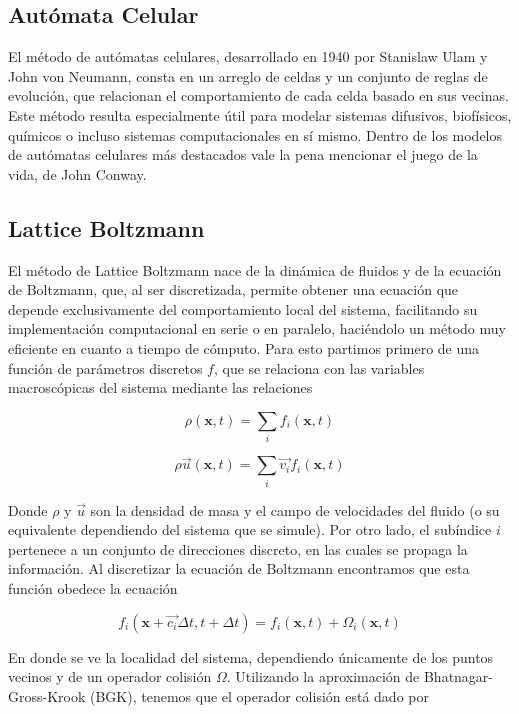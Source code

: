 \documentclass[12pts, letterpaper, twocolumn]{article}
\begin{document}
\subsection{Autómata Celular}
El método de autómatas celulares, desarrollado en 1940 por Stanislaw Ulam y John von 
Neumann, consta en un arreglo de celdas y un conjunto de reglas de evolución, que 
relacionan el comportamiento de cada celda basado en sus vecinas. Este método resulta 
especialmente útil para modelar sistemas difusivos, biofísicos, químicos o incluso 
sistemas computacionales en sí mismo. Dentro de los modelos de autómatas celulares más 
destacados vale la pena mencionar el juego de la vida, de John Conway.

\subsection{Lattice Boltzmann}
El método de Lattice Boltzmann nace de la dinámica de fluidos y de la ecuación de 
Boltzmann, que, al ser discretizada, permite obtener una ecuación que depende 
exclusivamente del comportamiento local del sistema, facilitando su implementación 
computacional en serie o en paralelo, haciéndolo un método muy eficiente en cuanto a 
tiempo de cómputo. Para esto partimos primero de una función de parámetros discretos $f$, 
que se relaciona con las variables macroscópicas del sistema mediante las relaciones 

\begin{equation*}
    \rho(\textbf{x}, t) = \sum_i f_i(\textbf{x}, t)
\end{equation*}

\begin{equation*}
    \rho\vec{u}(\textbf{x}, t) = \sum_i \vec{v_i} f_i(\textbf{x}, t)
\end{equation*}

Donde $\rho$ y $\vec{u}$ son la densidad de masa y el campo de velocidades del fluido (o 
su equivalente dependiendo del sistema que se simule). Por otro lado, el subíndice $i$ 
pertenece a un conjunto de direcciones discreto, en las cuales se propaga la información.
Al discretizar la ecuación de Boltzmann encontramos que esta función obedece la ecuación

\begin{equation}\label{eq:LB}
    f_i(\textbf{x}+\vec{c_i} \Delta t, t+\Delta t) = f_i(\textbf{x}, t) + \Omega_i(\textbf{x}, t)
\end{equation}

En donde se ve la localidad del sistema, dependiendo únicamente de los puntos vecinos y de 
un operador colisión $\Omega$. Utilizando la aproximación de Bhatnagar-Gross-Krook (BGK), 
tenemos que el operador colisión está dado por 
\end{document}

